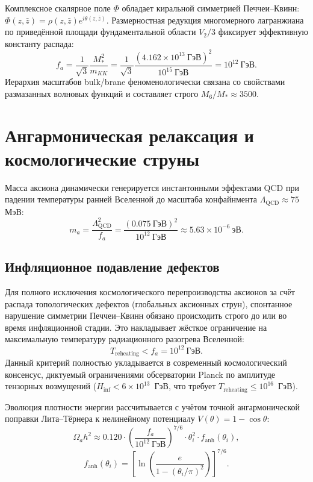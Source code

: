 \documentclass[12pt,a4paper]{article}
\begin{document}
Комплексное скалярное поле $\Phi$ обладает киральной симметрией Печчеи--Квинн: $\Phi(z,\bar{z}) = \rho(z,\bar{z}) e^{i\theta(z,\bar{z})}$. Размерностная редукция многомерного лагранжиана по приведённой площади фундаментальной области $V_2/3$ фиксирует эффективную константу распада:
\begin{equation}
\boxed{\; f_a = \frac{1}{\sqrt{3}} \frac{M_*^2}{m_{KK}} = \frac{1}{\sqrt{3}} \frac{(4.162 \times 10^{13} \ \text{ГэВ})^2}{10^{15} \ \text{ГэВ}} = 10^{12} \ \text{ГэВ}. \;}
\end{equation}
Иерархия масштабов bulk/brane феноменологически связана со свойствами размазанных волновых функций и составляет строго $M_6 / M_* \approx 3500$.

\section{Ангармоническая релаксация и космологические струны}
Масса аксиона динамически генерируется инстантонными эффектами QCD при падении температуры ранней Вселенной до масштаба конфайнмента $\Lambda_{\text{QCD}} \approx 75$ МэВ:
\begin{equation}
m_a = \frac{\Lambda_{\text{QCD}}^2}{f_a} = \frac{(0.075 \ \text{ГэВ})^2}{10^{12} \ \text{ГэВ}} \approx 5.63 \times 10^{-6} \ \text{эВ}.
\end{equation}

\subsection*{Инфляционное подавление дефектов}
Для полного исключения космологического перепроизводства аксионов за счёт распада топологических дефектов (глобальных аксионных струн), спонтанное нарушение симметрии Печчеи--Квинн обязано происходить строго до или во время инфляционной стадии. Это накладывает жёсткое ограничение на максимальную температуру радиационного разогрева Вселенной:
\begin{equation}
T_{\text{reheating}} < f_a = 10^{12} \ \text{ГэВ}.
\end{equation}
Данный критерий полностью укладывается в современный космологический консенсус, диктуемый ограничениями обсерватории Planck по амплитуде тензорных возмущений ($H_{\text{inf}} < 6 \times 10^{13}$~ГэВ, что требует $T_{\text{reheating}} \le 10^{16}$~ГэВ).

Эволюция плотности энергии рассчитывается с учётом точной ангармонической поправки Лита--Тёрнера к нелинейному потенциалу $V(\theta) = 1 - \cos\theta$:
\begin{equation}
\Omega_a h^2 \approx 0.120 \cdot \left(\frac{f_a}{10^{12} \ \text{ГэВ}}\right)^{7/6} \cdot \theta_i^2 \cdot f_{\text{anh}}(\theta_i),
\label{eq:omega_final}
\end{equation}
\begin{equation}
f_{\text{anh}}(\theta_i) = \left[ \ln \left( \frac{e}{1 - (\theta_i/\pi)^2} \right) \right]^{7/6}.
\end{equation}
\end{document}
